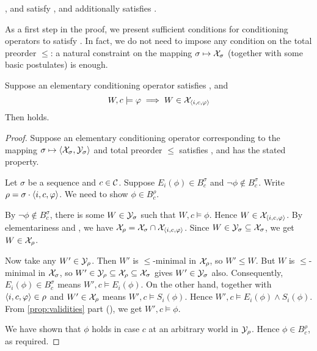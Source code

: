\begin{proposition}
    \label{prop:examples_satisfy_condsucc}
    \varbasedcond{}, \partbasedcond{} and \scorebasedop{}
    satisfy \condsucc{}, and \scorebasedop{} additionally
    satisfies \strongcondsucc{}.
\end{proposition}

As a first step in the proof, we present sufficient conditions for conditioning
operators to satisfy \condsucc{}. In fact, we do not need to impose any
condition on the total preorder $\le$: a natural constraint on the mapping
$\sigma \mapsto \mathcal{X}_\sigma$ (together with some basic postulates) is enough.

\begin{lemma}
    \label{lemma:conditioning_condsucc_sufficient_condition}
    Suppose an elementary conditioning operator satisfies \kconj{},
    \soundness{} and
    \[
        W, c \models \varphi \implies W \in \mathcal{X}_{\langle {i, c, \varphi} \rangle}
    \]
    Then \condsucc{} holds.
\end{lemma}

\begin{proof}
    Suppose an elementary conditioning operator corresponding to the mapping
    $\sigma \mapsto \langle {\mathcal{X}_\sigma, \mathcal{Y}_\sigma} \rangle$ and total preorder $\le$
    satisfies \kconj{}, \soundness{} and has the stated property.

    Let $\sigma$ be a sequence and $c \in \mathcal{C}$. Suppose $E_i(\phi) \in
    B^\sigma_c$ and $\neg\phi \notin B^\sigma_c$. Write $\rho = \sigma \cdot
    \langle {i, c, \varphi} \rangle$. We need to show $\phi \in B^\rho_c$.

    By $\neg\phi \notin B^\sigma_c$, there is some $W \in \mathcal{Y}_\sigma$ such that
    $W, c \models \phi$. Hence $W \in \mathcal{X}_{\langle {i, c, \varphi} \rangle}$. By
    elementariness and \kconj{}, we have $\mathcal{X}_\rho = \mathcal{X}_\sigma \cap
    \mathcal{X}_{\langle {i, c, \varphi} \rangle}$. Since $W \in \mathcal{Y}_\sigma \subseteq \mathcal{X}_\sigma$, we
    get $W \in \mathcal{X}_\rho$.

    Now take any $W' \in \mathcal{Y}_\rho$. Then $W'$ is $\le$-minimal in $\mathcal{X}_\rho$, so
    $W' \le W$. But $W$ is $\le$-minimal in $\mathcal{X}_\sigma$, so $W' \in \mathcal{Y}_\rho
    \subseteq \mathcal{X}_\rho \subseteq \mathcal{X}_\sigma$ gives $W' \in \mathcal{Y}_\sigma$ also.
    Consequently, $E_i(\phi) \in B^\sigma_c$ means $W', c \models E_i(\phi)$.
    On the other hand, \soundness{} together with $\langle {i, c, \varphi} \rangle \in \rho$
    and $W' \in \mathcal{X}_\rho$ means $W', c \models S_i(\phi)$. Hence $W', c \models
    E_i(\phi) \land S_i(\phi)$. From \cref{prop:validities}
    part (), we get $W', c \models \phi$.

    We have shown that $\phi$ holds in case $c$ at an arbitrary world in
    $\mathcal{Y}_\rho$. Hence $\phi \in B^\rho_c$, as required.

\end{proof}

